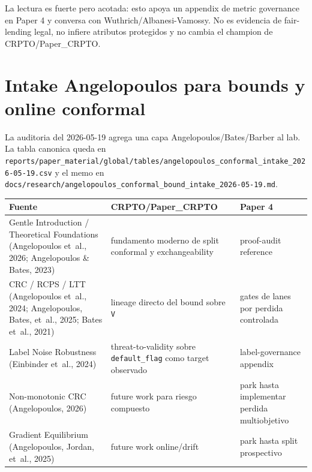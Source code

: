 \documentclass[
  spanish,
  11pt,
  letterpaper,
]{scrbook}
\newcounter{none} %
\theoremstyle{plain}
\theoremstyle{remark}
\begin{document}
La lectura es fuerte pero acotada: esto apoya un appendix de metric
governance en Paper 4 y conversa con Wuthrich/Albanesi-Vamossy. No es
evidencia de fair-lending legal, no infiere atributos protegidos y no
cambia el champion de CRPTO/Paper\_CRPTO.

\section{Intake Angelopoulos para bounds y online
conformal}\label{intake-angelopoulos-para-bounds-y-online-conformal}

La auditoria del 2026-05-19 agrega una capa Angelopoulos/Bates/Barber al
lab. La tabla canonica queda en
\texttt{reports/paper\_material/global/tables/angelopoulos\_conformal\_intake\_2026-05-19.csv}
y el memo en
\texttt{docs/research/angelopoulos\_conformal\_bound\_intake\_2026-05-19.md}.

{\def\LTcaptype{none} %
\begin{longtable}[]{@{}
  >{\raggedright\arraybackslash}p{}
  >{\raggedright\arraybackslash}p{}
  >{\raggedright\arraybackslash}p{}@{}}
\toprule\noalign{}
\begin{minipage}[b]{\linewidth}\raggedright
Fuente
\end{minipage} & \begin{minipage}[b]{\linewidth}\raggedright
CRPTO/Paper\_CRPTO
\end{minipage} & \begin{minipage}[b]{\linewidth}\raggedright
Paper 4
\end{minipage} \\
\midrule\noalign{}
\endhead
\bottomrule\noalign{}
\endlastfoot
Gentle Introduction / Theoretical Foundations (Angelopoulos et~al.,
2026; Angelopoulos \& Bates, 2023) & fundamento moderno de split
conformal y exchangeability & proof-audit reference \\
CRC / RCPS / LTT (Angelopoulos et~al., 2024; Angelopoulos, Bates,
et~al., 2025; Bates et~al., 2021) & lineage directo del bound sobre
\texttt{V} & gates de lanes por perdida controlada \\
Label Noise Robustness (Einbinder et~al., 2024) & threat-to-validity
sobre \texttt{default\_flag} como target observado & label-governance
appendix \\
Non-monotonic CRC (Angelopoulos, 2026) & future work para riesgo
compuesto & park hasta implementar perdida multiobjetivo \\
Gradient Equilibrium (Angelopoulos, Jordan, et~al., 2025) & future work
online/drift & park hasta split prospectivo \\
\end{longtable}
}
\end{document}
